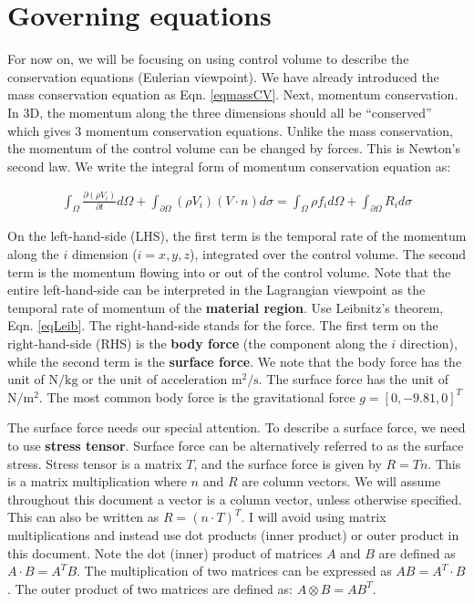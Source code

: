 \documentclass[12pt, letterpaper]{report}
\begin{document}
\clearpage
\section{Governing equations}

For now on, we will be focusing on using control volume to describe the conservation equations
(Eulerian viewpoint). We have already introduced the mass conservation equation as Eqn.
\ref{eqmassCV}. Next, momentum conservation. In 3D, the momentum along the three dimensions should
all be ``conserved'' which gives 3 momentum conservation equations. Unlike the mass conservation,
the momentum of the control volume can be changed by forces. This is Newton's second law. We write
the integral form of momentum conservation equation as:


\begin{align}\label{eqmom}
   \int_\Omega \frac{\partial(\rho V_i)}{\partial t}d\Omega + \int_{\partial\Omega}(\rho
   V_i)(V\cdot n)d\sigma = \int_\Omega \rho f_i d\Omega + \int_{\partial\Omega}R_i d\sigma
\end{align}

On the left-hand-side (LHS), the first term is the temporal rate of the momentum along the $i$ dimension
($i = x, y, z$), integrated over the control volume.  The second term is the momentum flowing into
or out of the control volume. Note that the entire left-hand-side can be interpreted in the
Lagrangian viewpoint as the temporal rate of momentum of the {\bf material region}. Use Leibnitz's
theorem, Eqn. \ref{eqLeib}. The right-hand-side stands for the force. The first term on the
right-hand-side (RHS) is the {\bf body force} (the component along the $i$ direction), while the second
term is the {\bf surface force}. We note that the body force has the unit of $\textrm{N/kg}$ or the
unit of acceleration $\mathrm{m^2/s}$. The surface force has the unit of $\mathrm{N/m^2}$. The most
common body force is the gravitational force $g = [0, -9.81, 0]^T$
\paraspace

The surface force needs our special attention. To describe a surface force, we need to use {\bf
stress tensor}. Surface force can be alternatively referred to as the surface stress. Stress tensor
is a matrix $T$, and the surface force is given by $R = Tn$. This is a matrix multiplication where
$n$ and $R$ are column vectors. We will assume throughout this document a vector is a column vector,
unless otherwise specified. This can also be written as $R = (n\cdot T)^T$. I will avoid using
matrix multiplications and instead use dot products (inner product) or outer product in this
document. Note the dot (inner) product of matrices $A$ and $B$ are defined as $A \cdot B = A^T B$.
The multiplication of two matrices can be expressed as $AB = A^T \cdot B$. The outer product of two
matrices are defined as: $A\mathop{\otimes}B = AB^T$. \paraspace
\end{document}
